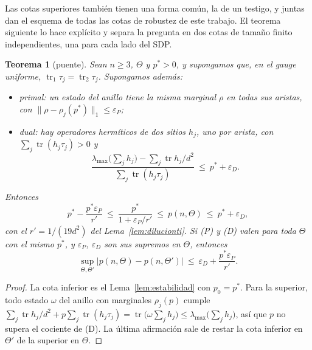 \documentclass[11pt,a4paper]{article}
\newtheorem{teorema}{Teorema}
\theoremstyle{remark}
\newcommand{\tr}{\operatorname{tr}}
\begin{document}
Las cotas superiores también tienen una forma común, la de un testigo, y juntas dan el esquema de
todas las cotas de robustez de este trabajo. El teorema siguiente lo hace explícito y separa la
pregunta en dos cotas de tamaño finito independientes, una para cada lado del SDP.

\begin{teorema}[puente]\label{teo:puente}
Sean $n\ge3$, $\Theta$ y $p^\ast>0$, y supongamos que, en el gauge uniforme,
$\tr_1\tau_j=\tr_2\tau_j$. Supongamos además:
\begin{itemize}
\item[(P)] \emph{primal}: un estado del anillo tiene la misma marginal $\rho$ en todas sus aristas, con
  $\|\rho-\rho_j(p^\ast)\|_1\le\varepsilon_P$;
\item[(D)] \emph{dual}: hay operadores hermíticos de dos sitios $h_j$, uno por arista, con
  $\sum_j\tr(h_j\tau_j)>0$ y
  \[
    \frac{\lambda_{\max}\big(\sum_jh_j\big)-\sum_j\tr h_j/d^2}{\sum_j\tr(h_j\tau_j)}\ \le\ p^\ast+\varepsilon_D .
  \]
\end{itemize}
Entonces
\[
  p^\ast-\frac{p^\ast\varepsilon_P}{r'}\ \le\ \frac{p^\ast}{1+\varepsilon_P/r'}\ \le\ p(n,\Theta)\ \le\ p^\ast+\varepsilon_D,
\]
con el $r'=1/(19d^2)$ del Lema~\ref{lem:dilucionti}. Si (P) y (D) valen para toda $\Theta$ con el
mismo $p^\ast$, y $\varepsilon_P$, $\varepsilon_D$ son sus supremos en $\Theta$, entonces
\[
  \sup_{\Theta,\Theta'}|p(n,\Theta)-p(n,\Theta')|\ \le\ \varepsilon_D+\frac{p^\ast\varepsilon_P}{r'} .
\]
\end{teorema}

\begin{proof}
La cota inferior es el Lema~\ref{lem:estabilidad} con $p_0=p^\ast$. Para la superior, todo estado
$\omega$ del anillo con marginales $\rho_j(p)$ cumple
$\sum_j\tr h_j/d^2+p\sum_j\tr(h_j\tau_j)=\tr\big(\omega\sum_jh_j\big)\le\lambda_{\max}\big(\sum_jh_j\big)$,
así que $p$ no supera el cociente de (D). La última afirmación sale de restar la cota inferior en
$\Theta'$ de la superior en $\Theta$.
\end{proof}
\end{document}
